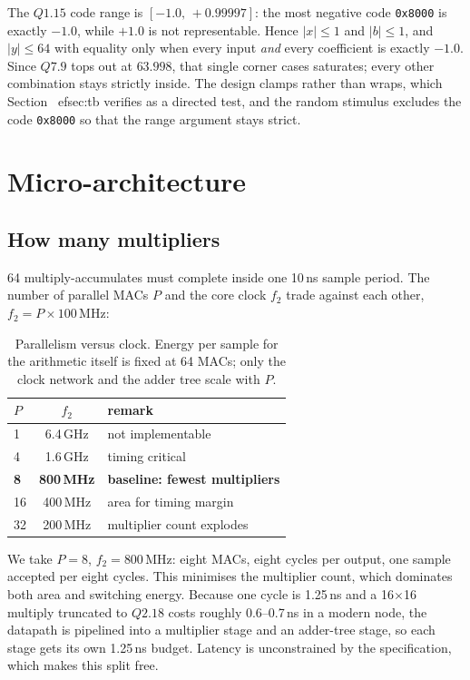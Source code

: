 \documentclass[conference]{IEEEtran}
\newcommand{\qf}[2]{Q#1.#2}
\begin{document}
The $\qf{1}{15}$ code range is $[-1.0,\,+0.99997]$: the most negative code
\texttt{0x8000} is exactly $-1.0$, while $+1.0$ is not representable. Hence
$|x|\le 1$ and $|b|\le 1$, and $|y|\le 64$ with equality only when every input
\emph{and} every coefficient is exactly $-1.0$. Since $\qf{7}{9}$ tops out at
$63.998$, that single corner cases saturates; every other combination stays
strictly inside. The design clamps rather than wraps, which
Section~
ef{sec:tb} verifies as a directed test, and the random stimulus
excludes the code \texttt{0x8000} so that the range argument stays strict.

\section{Micro-architecture}\label{sec:arch}

\subsection{How many multipliers}

64 multiply-accumulates must complete inside one 10\,ns sample period. The
number of parallel MACs $P$ and the core clock $f_2$ trade against each other,
$f_2 = P \times 100\,\mathrm{MHz}$:

\begin{table}[t]
\centering
\caption{Parallelism versus clock. Energy per sample for the arithmetic itself
is fixed at 64 MACs; only the clock network and the adder tree scale with $P$.}
\label{tab:p}
\begin{tabular}{@{}lcl@{}}
\toprule
$P$ & $f_2$ & remark\\
\midrule
1  & 6.4\,GHz & not implementable\\
4  & 1.6\,GHz & timing critical\\
\textbf{8} & \textbf{800\,MHz} & \textbf{baseline: fewest multipliers}\\
16 & 400\,MHz & area for timing margin\\
32 & 200\,MHz & multiplier count explodes\\
\bottomrule
\end{tabular}
\end{table}

We take $P=8$, $f_2=800\,\mathrm{MHz}$: eight MACs, eight cycles per output,
one sample accepted per eight cycles. This minimises the multiplier count,
which dominates both area and switching energy. Because one cycle is 1.25\,ns
and a 16$\times$16 multiply truncated to $\qf{2}{18}$ costs roughly
0.6--0.7\,ns in a modern node, the datapath is pipelined into a multiplier
stage and an adder-tree stage, so each stage gets its own 1.25\,ns budget.
Latency is unconstrained by the specification, which makes this split free.
\end{document}
